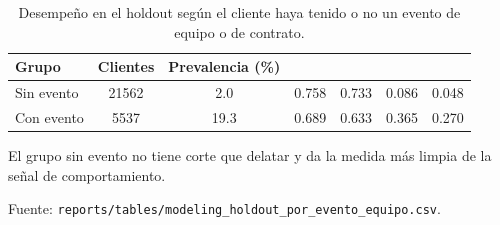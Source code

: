 \begin{table}[htbp]
  \centering
  \small
  \caption{Desempeño en el holdout según el cliente haya tenido o no un evento de equipo o de contrato.}
  \label{tab:subgrupos}
  \begin{threeparttable}
    \begin{tabular}{l S[table-format=5.0] S[table-format=2.1] S[table-format=1.3] S[table-format=1.3] S[table-format=1.3] S[table-format=1.3]}
      \toprule
      {Grupo} & {Clientes} & {Prevalencia (\%)} & {} & {} & {} & {} \\
      \midrule
      Sin evento & 21562 & 2.0 & 0.758 & 0.733 & 0.086 & 0.048 \\
      Con evento & 5537 & 19.3 & 0.689 & 0.633 & 0.365 & 0.270 \\
      \bottomrule
    \end{tabular}
    \begin{tablenotes}
      \footnotesize
      \item El grupo sin evento no tiene corte que delatar y da la medida más limpia de la señal de comportamiento.
      \item Fuente: \texttt{reports/tables/modeling\_holdout\_por\_evento\_equipo.csv}.
    \end{tablenotes}
  \end{threeparttable}
\end{table}
